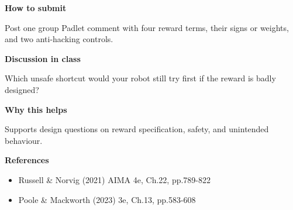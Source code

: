 \documentclass[11pt]{article}
\begin{document}
\begin{tcolorbox}[colback=white,colframe=MidnightBlue,title={Q5 Collaborative Mini-Case},fonttitle=\bfseries,breakable]
{\large\bfseries\color{MidnightBlue} How to submit}\par\medskip
Post one group Padlet comment with four reward terms, their signs or weights, and two anti-hacking controls.

{\large\bfseries\color{MidnightBlue} Discussion in class}\par\medskip
Which unsafe shortcut would your robot still try first if the reward is badly designed?

{\large\bfseries\color{MidnightBlue} Why this helps}\par\medskip
Supports design questions on reward specification, safety, and unintended behaviour.

{\large\bfseries\color{MidnightBlue} References}\par\medskip
\begin{itemize}\item Russell \& Norvig (2021) AIMA 4e, Ch.22, pp.789-822
\item Poole \& Mackworth (2023) 3e, Ch.13, pp.583-608\end{itemize}
\end{tcolorbox}
\end{document}
